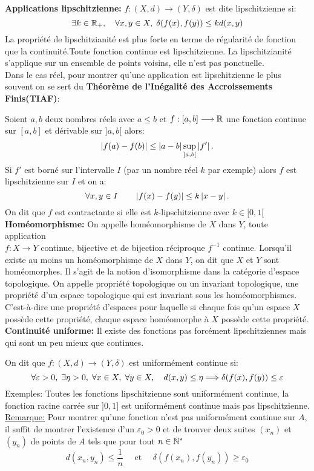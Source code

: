 \documentclass[12pt,a4paper]{article}
\begin{document}
	\textbf{Applications lipschitzienne:} $f : (X,d) \longrightarrow (Y,\delta) $ est dite lipschitzienne si:
	$$ \exists k \in \mathbb{R_+}, \quad\forall x,y\in X,\; \delta(f(x), f(y))\leq k d(x,y) $$
	La propriété de lipschitzianité est plus forte en terme de régularité de fonction que la continuité.Toute fonction continue est lipschitzienne. La lipschitzianité s'applique sur un ensemble de points voisins, elle n'est pas ponctuelle. \\
	Dans le cas réel, pour montrer qu'une application est lipschitzienne le plus souvent on se sert du \textbf{Théorème de l'Inégalité des Accroissements Finis(TIAF)}:
	\par Soient $a,b$ deux nombres réels avec $a\leq b$ et $f:[a,b]\longrightarrow \mathbb{R}$ une fonction continue sur $[a,b]$ et dérivable sur $]a,b[$ alors:
	\[\left\vert {f(a)-f(b)}\right\vert\leq\left\vert {a-b}\right\vert \sup\limits_{]a,b[ }\left\vert {f'}\right\vert. \]
	Si $f'$ est borné sur l'intervalle $I$ (par un nombre réel $k$ par exemple) alors $f$ est lipschitzienne sur $I$ et on a:
	\[\forall x,y \in I\qquad\left\vert {f(x)-f(y)}\right\vert\leq k \left\vert {x-y}\right\vert .\]
	On dit que $f$ est contractante si elle est $k$-lipschitzienne avec $k\in [0,1[$\\
	
	\textbf{Homéomorphisme:} On appelle homéomorphisme de $X$ dans $Y$, toute application\\$f:X\longrightarrow Y$ continue, bijective et de bijection réciproque $f^{-1}$ continue. Lorsqu'il existe au moins un homéomorphisme de $X$ dans $Y$, on dit que $X$ et $Y$ sont homéomorphes.
	Il s'agit de la notion d'isomorphisme dans la catégorie d'espace topologique. On appelle propriété topologique ou un invariant topologique, une propriété d'un espace topologique qui est invariant sous les homéomorphismes. C'est-à-dire une propriété d'espaces pour laquelle si chaque fois qu'un espace $X$ possède cette propriété, chaque espace homéomorphe à $X$ possède cette propriété.\\
	
	\textbf{Continuité uniforme:} Il existe des fonctions pas forcément lipschitziennes mais qui sont un peu mieux que continues.
	\par On dit que $f:(X,d)\longrightarrow (Y,\delta)$ est uniformément continue si:
	\[ \forall \varepsilon >0, \; \exists \eta >0, \; \forall x \in X ,\;\forall y\in X, \quad d(x,y)\leq\eta \Longrightarrow \delta(f(x),f(y))\leq\varepsilon   \]
	Exemples: Toutes les fonctions lipschitzienne sont uniformément continue, la fonction racine carrée sur $]0,1]$ est uniformément continue mais pas lipschitzienne.\\
	\underline{Remarque:} Pour montrer qu'une fonction n'est pas uniformément continue sur $A$, il suffit de montrer l'existence d'un $\varepsilon_0 >0$ et de trouver deux suites $(x_n)$ et $(y_n)$ de points de $A$ tels que pour tout $n\in \mathbb{N}^*$
	$$ d(x_n,y_n)\leq \frac{1}{n} \quad \text{ et } \quad \delta(f(x_n),f(y_n))\geq \varepsilon_0 $$ 
\end{document}
